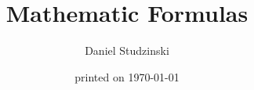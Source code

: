 \documentclass[a4paper,9pt,twopage,titltpage]{article}
\begin{document}
\title{Mathematic Formulas}
\date{printed on \today}
\author{Daniel Studzinski}
\maketitle\cleardoublepage


\tableofcontents\cleardoublepage
















 
\end{document}
